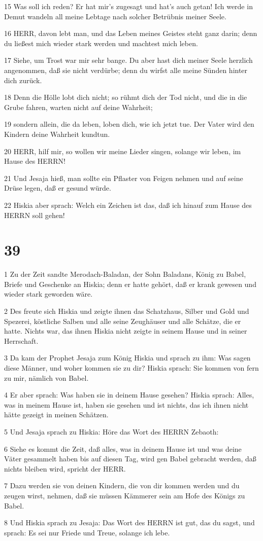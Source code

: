 \par 15 Was soll ich reden? Er hat mir's zugesagt und hat's auch getan! Ich werde in Demut wandeln all meine Lebtage nach solcher Betrübnis meiner Seele.
\par 16 HERR, davon lebt man, und das Leben meines Geistes steht ganz darin; denn du ließest mich wieder stark werden und machtest mich leben.
\par 17 Siehe, um Trost war mir sehr bange. Du aber hast dich meiner Seele herzlich angenommen, daß sie nicht verdürbe; denn du wirfst alle meine Sünden hinter dich zurück.
\par 18 Denn die Hölle lobt dich nicht; so rühmt dich der Tod nicht, und die in die Grube fahren, warten nicht auf deine Wahrheit;
\par 19 sondern allein, die da leben, loben dich, wie ich jetzt tue. Der Vater wird den Kindern deine Wahrheit kundtun.
\par 20 HERR, hilf mir, so wollen wir meine Lieder singen, solange wir leben, im Hause des HERRN!
\par 21 Und Jesaja hieß, man sollte ein Pflaster von Feigen nehmen und auf seine Drüse legen, daß er gesund würde.
\par 22 Hiskia aber sprach: Welch ein Zeichen ist das, daß ich hinauf zum Hause des HERRN soll gehen!

\chapter{39}

\par 1 Zu der Zeit sandte Merodach-Baladan, der Sohn Baladans, König zu Babel, Briefe und Geschenke an Hiskia; denn er hatte gehört, daß er krank gewesen und wieder stark geworden wäre.
\par 2 Des freute sich Hiskia und zeigte ihnen das Schatzhaus, Silber und Gold und Spezerei, köstliche Salben und alle seine Zeughäuser und alle Schätze, die er hatte. Nichts war, das ihnen Hiskia nicht zeigte in seinem Hause und in seiner Herrschaft.
\par 3 Da kam der Prophet Jesaja zum König Hiskia und sprach zu ihm: Was sagen diese Männer, und woher kommen sie zu dir? Hiskia sprach: Sie kommen von fern zu mir, nämlich von Babel.
\par 4 Er aber sprach: Was haben sie in deinem Hause gesehen? Hiskia sprach: Alles, was in meinem Hause ist, haben sie gesehen und ist nichts, das ich ihnen nicht hätte gezeigt in meinen Schätzen.
\par 5 Und Jesaja sprach zu Hiskia: Höre das Wort des HERRN Zebaoth:
\par 6 Siehe es kommt die Zeit, daß alles, was in deinem Hause ist und was deine Väter gesammelt haben bis auf diesen Tag, wird gen Babel gebracht werden, daß nichts bleiben wird, spricht der HERR.
\par 7 Dazu werden sie von deinen Kindern, die von dir kommen werden und du zeugen wirst, nehmen, daß sie müssen Kämmerer sein am Hofe des Königs zu Babel.
\par 8 Und Hiskia sprach zu Jesaja: Das Wort des HERRN ist gut, das du sagst, und sprach: Es sei nur Friede und Treue, solange ich lebe.


